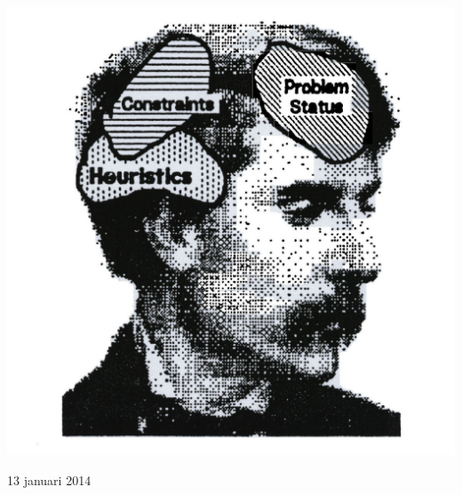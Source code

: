 \documentclass[10pt]{report}
\begin{document}
\begin{titlepage}
\begin{center}
\includegraphics[scale=0.15]{resources/pictures/ai.jpg}
\end{center}


{\large 13 januari 2014}\\[3cm]


 

\vfill %

\end{titlepage}
\newpage


\tableofcontents








\end{document}
